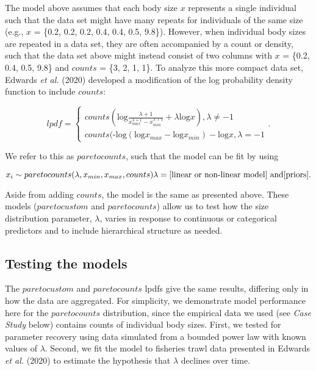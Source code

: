 \documentclass[
  12pt,
]{article}
\begin{document}
The model above assumes that each body size \(x\) represents a single
individual such that the data set might have many repeats for
individuals of the same size (e.g., \(x\) = \{0.2, 0.2, 0.2, 0.4, 0.4,
0.5, 9.8\}). However, when individual body sizes are repeated in a data
set, they are often accompanied by a count or density, such that the
data set above might instead consist of two columns with \(x\) = \{0.2,
0.4, 0.5, 9.8\} and \(counts\) = \{3, 2, 1, 1\}. To analyze this more
compact data set, Edwards \emph{et al.} (2020) developed a modification
of the log probability density function to include \(counts\):

\begin{equation}
 lpdf = \begin{cases}\textit{counts}(\text{log}\frac{\lambda + 1}{{x_{max}^{\lambda+1}} - {x_{min}^{\lambda+1}}} + \lambda\text{log}x), \lambda \neq-1 \\
\textit{counts}(
\text{-log}({{\text{log}x_{max}} - {\text{log}x_{min}}}) -\text{log}x, \lambda = -1\end{cases}.
\end{equation}

We refer to this as \(paretocounts\), such that the model can be fit by
using

\begin{equation}x_i\sim paretocounts(\lambda, x_{min}, x_{max}, counts)$$ $$\lambda = [\text{linear or non-linear model}] \text{ and}$$ $$\text{[priors]}.\end{equation}

Aside from adding \(counts\), the model is the same as presented above.
These models (\(paretocustom\) and \(paretocounts\)) allow us to test
how the size distribution parameter, \(\lambda\), varies in response to
continuous or categorical predictors and to include hierarchical
structure as needed.

\hypertarget{testing-the-models}{%
\subsection{Testing the models}\label{testing-the-models}}

The \(paretocustom\) and \(paretocounts\) lpdfs give the same results,
differing only in how the data are aggregated. For simplicity, we
demonstrate model performance here for the \(paretocounts\)
distribution, since the empirical data we used (see \emph{Case Study}
below) contains counts of individual body sizes. First, we tested for
parameter recovery using data simulated from a bounded power law with
known values of \(\lambda\). Second, we fit the model to fisheries trawl
data presented in Edwards \emph{et al.} (2020) to estimate the
hypothesis that \(\lambda\) declines over time.
\end{document}
